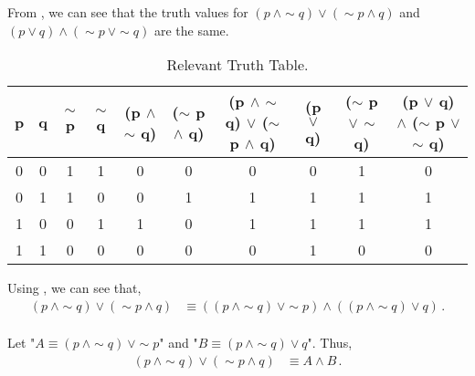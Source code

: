 %
%

\begin{subquestions}


\subquestion

\begin{subsubquestions}
	
\subsubquestion

From , we can see that the truth values for $(p ~\land \sim q) \lor (\sim p \land q)$ and $(p \lor q) \land (\sim p ~\lor \sim q)$ are the same.
\begin{table}[ht]
	\centering
	\begin{tabular}{|c|c|c|c|c|c|c|c|c|c|}
		\hline
		p & q & $\sim$ p & $\sim$ q & (p $\land$ $\sim$ q) & ($\sim$ p $\land$ q) & (p $\land$ $\sim$ q) $\lor$ ($\sim$ p $\land$ q) & (p $\lor$ q) & ($\sim$ p $\lor$ $\sim$ q) & (p $\lor$ q) $\land$ ($\sim$ p $\lor$ $\sim$ q) \\
		\hline
		0 & 0 & 1 & 1 & 0 & 0 & 0 & 0 & 1 & 0  \\
		0 & 1 & 1 & 0 & 0 & 1 & 1 & 1 & 1 & 1  \\ 
		1 & 0 & 0 & 1 & 1 & 0 & 1 & 1 & 1 & 1  \\
		1 & 1 & 0 & 0 & 0 & 0 & 0 & 1 & 0 & 0  \\
		\hline
	\end{tabular}
	\caption{\label{2016:q1:tab:TruthTab1} Relevant Truth Table.}
\end{table}


\subsubquestion

Using , we can see that,
\begin{align}
	(p ~\land \sim q) \lor (\sim p \land q) 
	& \equiv ((p ~\land \sim q) ~\lor \sim p) \land ((p ~\land \sim q) \lor q)\,. \label{2016:q1:Bool1}
\end{align}
\\
Let "$A \equiv (p ~\land \sim q) ~\lor \sim p$" and "$B \equiv (p ~\land \sim q) \lor q$". Thus, 
\begin{align}
	(p ~\land \sim q) \lor (\sim p \land q) 
	& \equiv A \land B \,.
\end{align}


\end{subsubquestions}
\end{subquestions}
